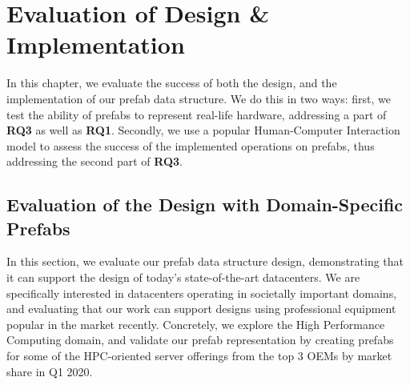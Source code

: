 \documentclass[11pt]{article}
\begin{document}
\section{Evaluation of Design \& Implementation} \label{sec:evaluation}
	In this chapter, we evaluate the success of both the design, and the implementation of our prefab data structure.
	We do this in two ways: first, we test the ability of prefabs to represent real-life hardware, addressing a part of \textbf{RQ3} as well as \textbf{RQ1}.
	Secondly, we use a popular Human-Computer Interaction model to assess the success of the implemented operations on prefabs, thus addressing the second part of \textbf{RQ3}.

	\subsection{Evaluation of the Design with Domain-Specific Prefabs} \label{sec:domainspecificprefabs}
		In this section, we evaluate our prefab data structure design, demonstrating that it can support the design of today's state-of-the-art datacenters. 
		We are specifically interested in datacenters operating in societally important domains, and evaluating that our work can support designs using professional equipment popular in the market recently. 
		Concretely, we explore the High Performance Computing domain, and validate our prefab representation by creating prefabs for some of the HPC-oriented server offerings from the top 3 OEMs by market share in Q1 2020.
	
\end{document}
